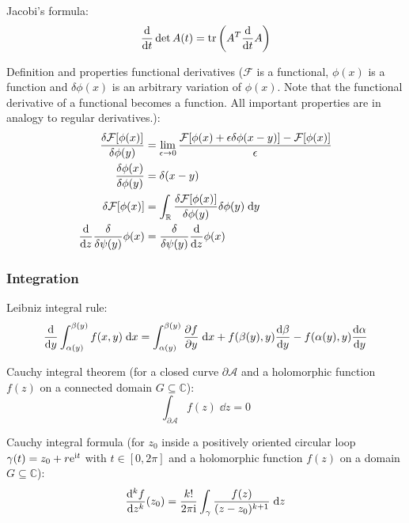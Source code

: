 			\noindent
			Jacobi's formula:
			\begin{equation}
				\dv{t}\det A(t) = \tr \qty(A^T \dv{t} A)
			\end{equation}

			\noindent
			Definition and properties functional derivatives ($\mathcal{F}$ is a functional, $\phi(x)$ is a function and $\delta \phi(x)$ is an arbitrary variation of $\phi(x)$. Note that the functional derivative of a functional becomes a function. All important properties are in analogy to regular derivatives.):
			\begin{equation}
				\begin{aligned}
					\fdv{\mathcal{F}\qty[\phi(x)]}{\phi(y)} &= \lim_{\epsilon\rightarrow 0} \frac{	\mathcal{F}\qty[\phi(x) + \epsilon\delta\phi(x-y)] - \mathcal{F}\qty[\phi(x)]}{\epsilon} \\
					\frac{\delta \phi(x)}{\delta \phi(y)} &= \delta(x-y) \\
					\delta \mathcal{F}\qty[\phi(x)] &= \int_\mathbb{R} \frac{\delta \mathcal{F}\qty[\phi(x)]}{\delta \phi(y)}\delta\phi(y)\;\dd y \\
					\dv{z} \fdv{\psi(y)} \phi(x) &= \fdv{\psi(y)} \dv{z} \phi(x) \\
				\end{aligned}
			\end{equation}

		\subsubsection{Integration}
			\noindent
			Leibniz integral rule:
			\begin{equation}
				\dv{y} \int_{\alpha(y)}^{\beta(y)}f(x,y)\;\dd x = \int_{\alpha(y)}^{\beta(y)} \pdv{f}{y}(x,y)\;\dd x + f(\beta(y),y)\dv{\beta}{y}(y)-f(\alpha(y),y)\dv{\alpha}{y}(y)
			\end{equation}

			\noindent
			Cauchy integral theorem (for a closed curve $\partial \mathcal{A}$ and a holomorphic function $f(z)$ on a connected domain $G \subseteq \mathbb{C}$):
			\begin{equation}
				\int_{\partial \mathcal{A}} f(z)\;\dd z = 0
			\end{equation}

			\noindent
			Cauchy integral formula (for $z_0$ inside a positively oriented circular loop $\gamma(t)=z_0+r\mathrm{e}^{\mathrm{i} t}$ with $t\in[0,2\pi]$ and a holomorphic function $f(z)$ on a domain $G \subseteq \mathbb{C}$):
			\begin{equation}
				\dv[k]{f}{z} \qty(z_0) = \frac{k!}{2\pi \mathrm{i}} \int_\gamma \frac{f(z)}{(z-z_0)^{k+1}}\;\dd z
			\end{equation}

